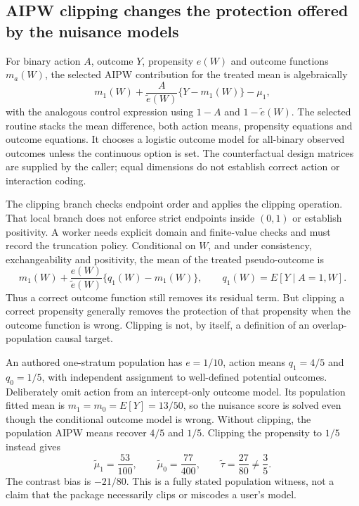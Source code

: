 \subsection{AIPW clipping changes the protection offered by the nuisance models}
For binary action $A$, outcome $Y$, propensity $e(W)$ and outcome
functions $m_a(W)$, the selected AIPW contribution for the treated mean
is algebraically
\[
 m_1(W)+\frac{A}{\widetilde e(W)}\{Y-m_1(W)\}-\mu_1,
\]
with the analogous control expression using $1-A$ and
$1-\widetilde e(W)$. The selected routine stacks the mean difference,
both action means, propensity equations and outcome equations. It chooses
a logistic outcome model for all-binary observed outcomes unless the
continuous option is set. The counterfactual design matrices are supplied
by the caller; equal dimensions do not establish correct action or
interaction coding.\citep{exec24_delicatessen_source}

The clipping branch checks endpoint order and applies the clipping
operation. That local branch does not enforce strict endpoints inside
$(0,1)$ or establish positivity. A worker needs explicit domain and
finite-value checks and must record the truncation policy. Conditional
on $W$, and under consistency, exchangeability and positivity, the mean
of the treated pseudo-outcome is
\[
 m_1(W)+\frac{e(W)}{\widetilde e(W)}
       \{q_1(W)-m_1(W)\},
 \qquad q_1(W)=E[Y\mid A=1,W].
\]
Thus a correct outcome function still removes its residual term. But
clipping a correct propensity generally removes the protection of that
propensity when the outcome function is wrong. Clipping is not, by itself,
a definition of an overlap-population causal target.
\citep{exec24_delicatessen_source,exec24_delicatessen_choice}

An authored one-stratum population has $e=1/10$, action means
$q_1=4/5$ and $q_0=1/5$, with independent assignment to well-defined
potential outcomes. Deliberately omit action from an intercept-only
outcome model. Its population fitted mean is
$m_1=m_0=E[Y]=13/50$, so the nuisance score is solved even though the
conditional outcome model is wrong. Without clipping, the population
AIPW means recover $4/5$ and $1/5$. Clipping the propensity to $1/5$
instead gives
\[
 \widetilde\mu_1=\frac{53}{100},\qquad
 \widetilde\mu_0=\frac{77}{400},\qquad
 \widetilde\tau=\frac{27}{80}\ne\frac35.
\]
The contrast bias is $-21/80$. This is a fully stated population witness,
not a claim that the package necessarily clips or miscodes a user's model.
\citep{exec24_delicatessen_choice}

